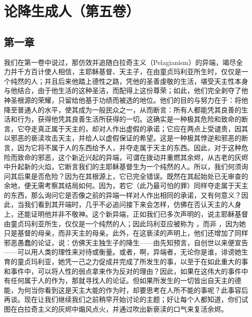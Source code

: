 \section{论降生成人（第五卷）}


\subsection{第一章}

\par

我们在第一卷中说过，那仿效并追随白拉奇主义（Pelagianism）的异端，竭尽全力并千方百计使人相信，主耶稣基督、天主子，在由童贞玛利亚所生时，仅仅是一个纯然的人；并且后来他踏上德性之路，凭他的圣善虔敬的生活，堪受天主性本身与他结合，由于他生活的这种圣洁，而配得上这份尊荣；如此，他们完全剥夺了他神圣根源的荣耀，只留给他基于功绩而被选的地位。他们的目的与努力在于：将他降至普通人的水平，使其成为一般民众之一，从而断言：所有人都能凭其良善的生活和行为，获得他凭其良善生活所获得的一切。这确实是一种极其危险和致命的断言，它夺走真正属于天主的，却对人作出虚假的承诺；它应在两点上受谴责，因其以邪恶的亵渎攻击天主，并给人以虚假保证的希望。这是一种极其悖逆和邪恶的断言，因为它将不属于人的东西给予人，并夺走属于天主的东西。因此，对于这种危险而致命的邪恶，这个新近兴起的异端，可谓在拨动并重燃其余烬，从古老的灰烬中升起新的火焰，它断言我们的主耶稣基督生为一个纯然的人。所以，我们何须询问其后果是否危险？因为在其根源上，它已完全错误。既然在其起始处已无审查的余地，便无需考察其结局如何。因为，若它（此乃最可怕的罪）同样夺走属于天主的东西，那么询问它是否像之前的异端一样对人作出相同的承诺，又有何意义？因此，当我们看到其开端时，几乎不必追问接下来会怎样，仿佛在否认天主的人身上，还能证明他并非不敬神。\newline{}这个新异端，正如我们已多次声明的，说主耶稣基督由童贞玛利亚所生，仅仅是一个纯然的人；因此玛利亚应被称为 ，而非 ，因为她只是基督的母亲，而非天主的母亲。此外，在这亵渎的声明上，他们还增加了同样邪恶愚蠢的论证，说：仿佛天主独生子的降生——由先知预言，自创世以来便宣告——可以用人类的理性来对待或衡量。或者，啊，异端者，无论你是谁，诽谤她生育的童贞玛利亚，她凭一己之力促成并完成了所发生的事，以至于在如此重大的事和事件中，可以将人性的弱点拿来作为反对的理由？因此，如果在这伟大的事件中有任何属于人的作为，那就寻找人的论证。但如果所发生的一切皆出自天主的德能，为何当你看到这是天主大能的作为时，却要思考在人所不能的事呢？此事容后再谈。现在让我们继续我们之前稍早开始讨论的主题；好让每个人都知道，你们试图在白拉奇主义的灰烬中煽风点火，并通过吹出新亵渎的口气来复活余烬。\par

